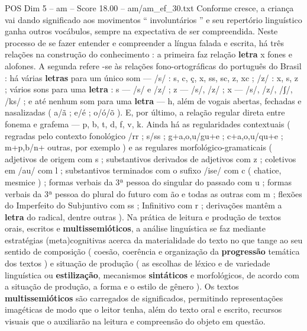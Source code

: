 \begin{textsample}{POS Dim 5 – am – Score 18.00 – am/am\_ef\_30.txt}
Conforme cresce, a criança vai dando significado aos movimentos “ involuntários ” e seu repertório linguístico ganha outros vocábulos, sempre na expectativa de ser compreendida.
Neste processo de se fazer entender e compreender a língua falada e escrita, há três relações na construção do conhecimento : a primeira faz relação \textbf{letra} x fones e alofones.
A segunda refere -se às relações fono-ortográficas do português do Brasil : há várias \textbf{letras} para um único som — /s/ : s, c, ç, x, ss, sc, z, xc ; /z/ : x, s, z ; vários sons para uma \textbf{letra} : s — /s/ e /z/ ; z — /s/, /z/ ; x — /s/, /z/, /ʃ/, /ks/ ; e até nenhum som para uma \textbf{letra} — h, além de vogais abertas, fechadas e nasalizadas ( a/ã ; e/é ; o/ó/õ ).
E, por último, a relação regular direta entre fonema e grafema — p, b, t, d, f, v, k.
Ainda há as regularidades contextuais ( regradas pelo contexto fonológico /rr ; s/ss ; g+a,o,u/gu+e ; c+a,o,u/qu+e ; m+p,b/n+ outras, por exemplo ) e as regulares morfológico-gramaticais ( adjetivos de origem com s ; substantivos derivados de adjetivos com z ; coletivos em /au/ com l ; substantivos terminados com o sufixo /ise/ com c ( chatice, mesmice ) ; formas verbais da 3ª pessoa do singular do passado com u ; formas verbais da 3ª pessoa do plural do futuro com ão e todas as outras com m ; flexões do Imperfeito do Subjuntivo com ss ; Infinitivo com r ; derivações mantêm a \textbf{letra} do radical, dentre outras ).
Na prática de leitura e produção de textos orais, escritos e \textbf{multissemióticos}, a análise linguística se faz mediante estratégias (meta)cognitivas acerca da materialidade do texto no que tange ao seu sentido de composição ( coesão, coerência e organização da \textbf{progressão} temática dos textos ) e situação de produção ( as escolhas de léxico e de variedade linguística ou \textbf{estilização}, mecanismos \textbf{sintáticos} e morfológicos, de acordo com a situação de produção, a forma e o estilo de gênero ).
Os textos \textbf{multissemióticos} são carregados de significados, permitindo representações imagéticas de modo que o leitor tenha, além do texto oral e escrito, recursos visuais que o auxiliarão na leitura e compreensão do objeto em questão.

\end{textsample}
